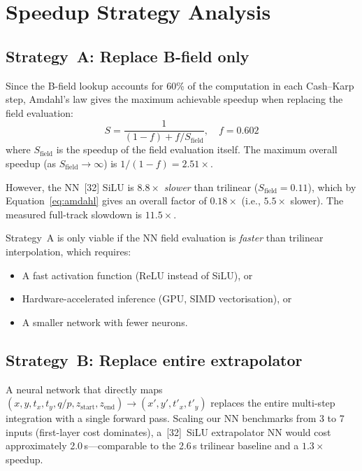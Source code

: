 \documentclass[11pt,a4paper]{article}
\newcommand{\SI}[2]{#1\,#2}
\begin{document}
\section{Speedup Strategy Analysis}
\label{sec:strategies}

\subsection{Strategy~A: Replace B-field only}

Since the B-field lookup accounts for 60\% of the computation in each
Cash--Karp step, Amdahl's law gives the maximum achievable speedup
when replacing the field evaluation:
\begin{equation}
    S = \frac{1}{(1 - f) + f / S_{\text{field}}},
    \quad f = 0.602
    \label{eq:amdahl}
\end{equation}
where $S_{\text{field}}$ is the speedup of the field evaluation itself.
The maximum overall speedup (as $S_{\text{field}} \to \infty$) is
$1/(1-f) = 2.51\times$.

However, the NN~[32] SiLU is $8.8\times$ \emph{slower} than trilinear
($S_{\text{field}} = 0.11$), which by Equation~\ref{eq:amdahl} gives
an overall factor of $0.18\times$ (i.e., $5.5\times$ slower).  The
measured full-track slowdown is $11.5\times$.

Strategy~A is only viable if the NN field evaluation is \emph{faster}
than trilinear interpolation, which requires:
\begin{itemize}
    \item A fast activation function (ReLU instead of SiLU), or
    \item Hardware-accelerated inference (GPU, SIMD vectorisation), or
    \item A smaller network with fewer neurons.
\end{itemize}

\subsection{Strategy~B: Replace entire extrapolator}

A neural network that directly maps
$(x, y, t_x, t_y, q/p, z_{\text{start}}, z_{\text{end}})
\to (x', y', t'_x, t'_y)$
replaces the entire multi-step integration with a single forward pass.
Scaling our NN benchmarks from 3 to 7 inputs (first-layer cost
dominates), a~[32]~SiLU extrapolator NN would cost approximately
\SI{2.0}{\textmu s}---comparable to the \SI{2.6}{\textmu s} trilinear
baseline and a $1.3\times$ speedup.
\end{document}
